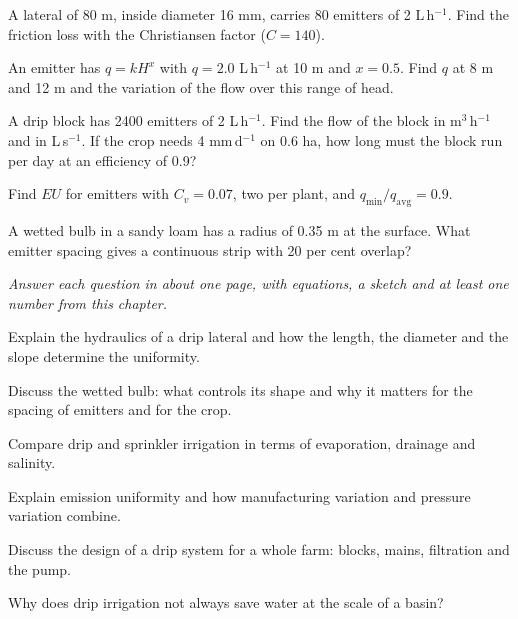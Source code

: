 \begin{exlist}
\item A lateral of 80 m, inside diameter 16 mm, carries 80 emitters of 2 L\,h$^{-1}$. Find the friction loss with the Christiansen factor ($C=140$).
\item An emitter has $q=kH^{x}$ with $q=2.0$ L\,h$^{-1}$ at 10 m and $x=0.5$. Find $q$ at 8 m and 12 m and the variation of the flow over this range of head.
\item A drip block has 2400 emitters of 2 L\,h$^{-1}$. Find the flow of the block in m$^3$\,h$^{-1}$ and in L\,s$^{-1}$. If the crop needs 4 mm\,d$^{-1}$ on 0.6 ha, how long must the block run per day at an efficiency of 0.9?
\item Find $EU$ for emitters with $C_v=0.07$, two per plant, and $q_{\min}/q_{\mathrm{avg}}=0.9$.
\item A wetted bulb in a sandy loam has a radius of 0.35 m at the surface. What emitter spacing gives a continuous strip with 20 per cent overlap?
\end{exlist}
{\small\itshape Answer each question in about one page, with equations, a sketch and at least one number from this chapter.}\par\vspace{3pt}
\begin{exlist}
\item Explain the hydraulics of a drip lateral and how the length, the diameter and the slope determine the uniformity.
\item Discuss the wetted bulb: what controls its shape and why it matters for the spacing of emitters and for the crop.
\item Compare drip and sprinkler irrigation in terms of evaporation, drainage and salinity.
\item Explain emission uniformity and how manufacturing variation and pressure variation combine.
\item Discuss the design of a drip system for a whole farm: blocks, mains, filtration and the pump.
\item Why does drip irrigation not always save water at the scale of a basin?
\end{exlist}
